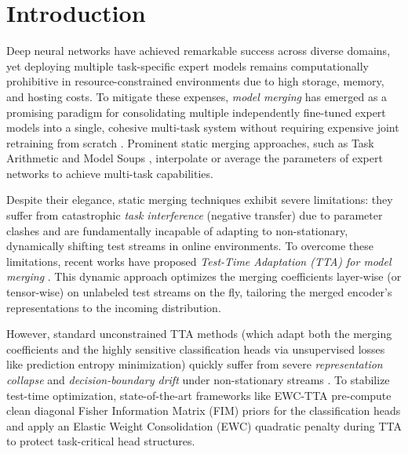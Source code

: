 \documentclass{article}
\theoremstyle{plain}
\theoremstyle{definition}
\theoremstyle{remark}
\begin{document}
\printAffiliationsAndNotice{\icmlEqualContribution}

\section{Introduction}
\label{sec:intro}
Deep neural networks have achieved remarkable success across diverse domains, yet deploying multiple task-specific expert models remains computationally prohibitive in resource-constrained environments due to high storage, memory, and hosting costs. To mitigate these expenses, \textit{model merging} has emerged as a promising paradigm for consolidating multiple independently fine-tuned expert models into a single, cohesive multi-task system without requiring expensive joint retraining from scratch \cite{ainsworth2022git, wortsman2022model, choshen2022fusing}. Prominent static merging approaches, such as Task Arithmetic \cite{ilharco2022editing} and Model Soups \cite{wortsman2022model}, interpolate or average the parameters of expert networks to achieve multi-task capabilities.

Despite their elegance, static merging techniques exhibit severe limitations: they suffer from catastrophic \textit{task interference} (negative transfer) due to parameter clashes and are fundamentally incapable of adapting to non-stationary, dynamically shifting test streams in online environments. To overcome these limitations, recent works have proposed \textit{Test-Time Adaptation (TTA) for model merging} \cite{nacke2023synergistic, shao2023test}. This dynamic approach optimizes the merging coefficients layer-wise (or tensor-wise) on unlabeled test streams on the fly, tailoring the merged encoder's representations to the incoming distribution.

However, standard unconstrained TTA methods (which adapt both the merging coefficients and the highly sensitive classification heads via unsupervised losses like prediction entropy minimization) quickly suffer from severe \textit{representation collapse} and \textit{decision-boundary drift} under non-stationary streams \cite{goyal2023sharpness}. To stabilize test-time optimization, state-of-the-art frameworks like EWC-TTA pre-compute clean diagonal Fisher Information Matrix (FIM) priors for the classification heads and apply an Elastic Weight Consolidation (EWC) \cite{kirkpatrick2017overcoming} quadratic penalty during TTA to protect task-critical head structures. 
\end{document}

